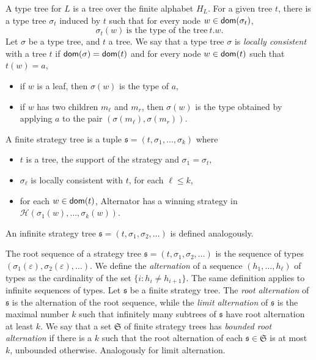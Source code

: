 A type tree for $L$ is a tree over the finite alphabet $H_L$. For a given tree $t$, there is a type tree $\sigma_t$ induced by $t$ such that for every node $w \in \mathsf{dom}(\sigma_t)$, 
\begin{equation}
\label{formula:sigmat}
\sigma_t(w)\ \mbox{is the type of the tree}\ t.w.
\end{equation}
Let $\sigma$ be a type tree, and $t$ a tree. We say that a type tree $\sigma$ is \emph{locally consistent} with a tree $t$ if $\mathsf{dom}(\sigma)=\mathsf{dom}(t)$ and for every node $w \in \mathsf{dom}(t)$ such that $t(w)=a$, 
\begin{itemize}
\item if $w$ is a leaf, then $\sigma(w)$ is the type of $a$,
\item if $w$ has two children $m_\ell$ and $m_r$, then $\sigma(w)$ is the type obtained by applying $a$ to the pair $(\sigma(m_\ell), \sigma(m_r))$.
\end{itemize}
\begin{definition} A finite strategy tree is a tuple
$\mathfrak{s}=(t, \sigma_1, \dots, \sigma_k)$ where
\begin{itemize}
\item $t$ is a tree, the support of the strategy and $\sigma_1=\sigma_t$,
\item $\sigma_\ell$ is locally consistent with $t$, for each $\ell \leq k$,
\item for each $w \in \mathsf{dom}(t)$, Alternator has a winning strategy in $\mathcal{H}(\sigma_1(w), \dots, \sigma_k(w))$.
\end{itemize}
An  infinite strategy tree $\mathfrak{s}=(t, \sigma_1, \sigma_2, \dots )$ is defined analogously.
\end{definition}
The root sequence of a strategy tree $\mathfrak{s}=(t, \sigma_1, \sigma_2, \dots )$ is the sequence of types $(\sigma_1(\varepsilon), \sigma_2(\varepsilon), \dots)$.  We define the \emph{alternation} of a sequence $(h_1,\dots,h_\ell)$ of types as the cardinality of the set $\{ i: h_i\neq h_{i+1} \}$. The same definition applies to infinite sequences of types. Let $\mathfrak{s}$ be a finite strategy tree. The \emph{root alternation} of $\mathfrak{s}$ is the alternation of the root sequence, while the \emph{limit alternation} of $\mathfrak{s}$ is the maximal number $k$ such that infinitely many subtrees of $\mathfrak{s}$ have root alternation at least $k$. We say that a set  $\mathfrak{S}$ of finite strategy trees has \emph{bounded root alternation} if there is a  $k$ such that the root alternation of each $\mathfrak{s} \in \mathfrak{S}$ is at most $k$, unbounded otherwise. Analogously for limit alternation.

